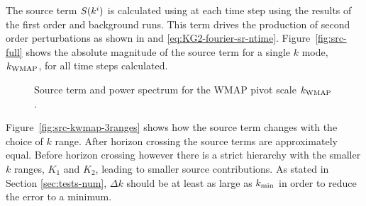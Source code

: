 The source term $S(k^i)$ is calculated using  at each time
step using the results of the first order and background runs. This term
drives the production of second order perturbations as shown in
 and
\eqref{eq:KG2-fourier-sr-ntime}. Figure~\ref{fig:src-full} shows the
absolute magnitude of the source term for a single $k$ mode, $\kwmap$,
for all time steps calculated.
% 
\begin{figure}
\centering
{}\qquad
% 
\caption[The source term and power spectrum for $\kwmap$]{Source term and power
spectrum for the WMAP pivot scale $\kwmap$.}
\end{figure}
% 
Figure~\ref{fig:src-kwmap-3ranges} shows how the source term changes
with the choice of $k$ range.  After horizon crossing the source terms
are approximately equal. Before horizon crossing however there is a
strict hierarchy with the smaller $k$ ranges, $K_1$ and $K_2$, leading to
smaller source
contributions.  As stated in Section \ref{sec:tests-num}, $\Delta k$
should be at least as large as $k_{\mathrm{min}}$ in order to reduce the error to
a minimum.
% 
